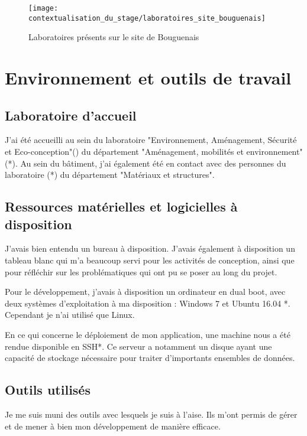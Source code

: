 \begin{figure}
  \centering
  \texttt{[image: contextualisation\_du\_stage/laboratoires\_site\_bouguenais]}
  \caption{Laboratoires présents sur le site de Bouguenais}
\end{figure}


\section{Environnement et outils de travail}
  \subsection{Laboratoire d'accueil}

J'ai été accueilli au sein du laboratoire "Environnement, Aménagement, Sécurité et Eco-conception"() du département "Aménagement, mobilités et environnement" (*). Au sein du bâtiment, j'ai également été en contact avec des personnes du laboratoire (*) du département "Matériaux et structures".

  \subsection{Ressources matérielles et logicielles à disposition}

J'avais bien entendu un bureau à disposition. J'avais également à disposition un tableau blanc qui m'a beaucoup servi pour les activités de conception, ainsi que pour réfléchir sur les problématiques qui ont pu se poser au long du projet.

Pour le développement, j'avais à disposition un ordinateur en dual boot, avec deux systèmes d'exploitation à ma disposition : Windows 7 et Ubuntu 16.04 *. Cependant je n'ai utilisé que Linux.

En ce qui concerne le déploiement de mon application, une machine nous a été rendue disponible en \gls{SSH}*. Ce serveur a notamment un disque ayant une capacité de stockage nécessaire pour traiter d'importants ensembles de données.

  \subsection{Outils utilisés}

Je me suis muni des outils avec lesquels je suis à l'aise. Ils m'ont permis de gérer et de mener à bien mon développement de manière efficace.

